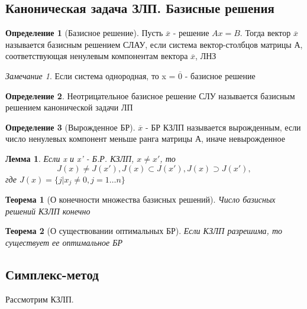 \documentclass[a4paper]{article}
\newtheorem{theorem}{Теорема}[section]
\newtheorem{lemma}{Лемма}[section]
\theoremstyle{definition}
\newtheorem*{definition}{Определение}
\theoremstyle{remark}
\newtheorem*{remark}{Замечание}
\begin{document}
\subsection{Каноническая задача ЗЛП. Базисные решения}
\begin{definition}[Базисное решение]
    Пусть $\overline{x}$ - решение $Ax = B$. Тогда вектор $\overline{x}$ называется базисным решением СЛАУ, если система вектор-столбцов матрицы А, соответствующая ненулевым компонентам вектора $\overline{x}$, ЛНЗ
\end{definition}
\begin{remark}
    Если система однородная, то x = $\overline{0}$ - базисное решение
\end{remark}
\begin{definition}
    Неотрицательное базисное решение СЛУ называется базисным решением канонической задачи ЛП
\end{definition}
\begin{definition}[Вырожденное БР]
    $\overline{x}$ - БР КЗЛП называется вырожденным, если число ненулевых компонент меньше ранга матрицы А, иначе невырожденное
\end{definition}
\begin{lemma}
    Если x и x' - Б.Р. КЗЛП, $x\neq x'$, то \[J(x) \neq J(x'), J(x)\subset J(x'), J(x) \supset J(x'),\] где $J(x) = \{j | x_j \neq 0, j = 1\dots n\}$
\end{lemma}
\begin{theorem}[О конечности множества базисных решений]
    Число базисных решений КЗЛП конечно
\end{theorem}
\begin{theorem}[О существовании оптимальных БР]
    Если КЗЛП разрешима, то существует ее оптимальное БР
\end{theorem}
\subsection{Симплекс-метод}
Рассмотрим КЗЛП.
\end{document}
